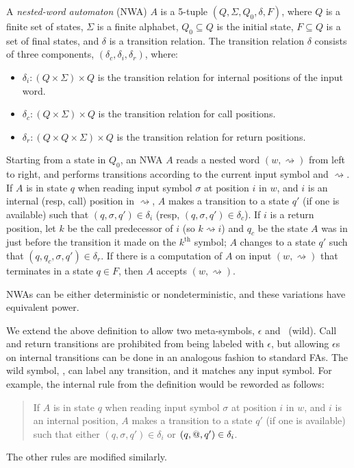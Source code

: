 \begin{definition}
  A \emph{nested-word automaton} (NWA) $A$ is a 5-tuple $(Q, \Sigma, Q_0,
  \delta, F)$, where $Q$ is a finite set of states, $\Sigma$ is a finite
  alphabet, $Q_0 \subseteq Q$ is the initial state, $F \subseteq Q$ is a set of
  final states, and $\delta$ is a transition relation. The transition
  relation $\delta$ consists of three components, $(\delta_c, \delta_i,
  \delta_r)$, where:
  \begin{itemize}
    \item
      $\delta_i: (Q \times \Sigma) \times Q$ is the transition relation for
      internal positions of the input word.
    \item
      $\delta_c: (Q \times \Sigma) \times Q$ is the transition relation for
      call positions.
    \item
      $\delta_r: (Q \times Q \times \Sigma) \times Q$ is the transition
      relation for return positions.
  \end{itemize}

  Starting from a state in $Q_0$, an NWA $A$ reads a nested word $(w,\rightsquigarrow)$
  from left to right, and performs transitions according to the current input
  symbol and $\rightsquigarrow$.  If $A$ is in state $q$ when reading input
  symbol $\sigma$ at position $i$ in $w$, and $i$ is an internal (resp, call)
  position in $\rightsquigarrow$, $A$ makes a transition to a state $q'$ (if
  one is available) such that $(q,\sigma,q')\in\delta_i$ (resp,
  $(q,\sigma,q')\in\delta_c$).  If $i$ is a return position, let $k$ be the
  call predecessor of $i$ (so $k \rightsquigarrow i$) and $q_c$ be the state
  $A$ was in just before the transition it made on the $k^{\textrm{th}}$
  symbol; $A$ changes to a state $q'$ such that $(q,q_c,\sigma,q')
  \in\delta_r$. If there is a computation of $A$ on input
  $(w,\rightsquigarrow)$ that terminates in a state $q\in F$, then $A$
  accepts $(w,\rightsquigarrow)$.

  NWAs can be either deterministic or nondeterministic, and these variations have
  equivalent power.
\end{definition}

We extend the above definition to allow two meta-symbols, $\epsilon$ and
\wild\ (wild). Call and return transitions are prohibited from being labeled
with $\epsilon$, but allowing $\epsilon$s on internal transitions can be done
in an analogous fashion to standard FAs. %
The
wild symbol, \wild, can label any transition, and it matches any input
symbol. For example, the internal rule from the definition would be reworded
as follows:
\begin{quote}If $A$ is in state $q$ when reading input
  symbol $\sigma$ at position $i$ in $w$, and $i$ is an internal
  position, $A$ makes a transition to a state $q'$ (if
  one is available) such that either $(q,\sigma,q')\in\delta_i$ or
  $(q,@,q')\in\delta_i$.
\end{quote}
The other rules are modified similarly.


